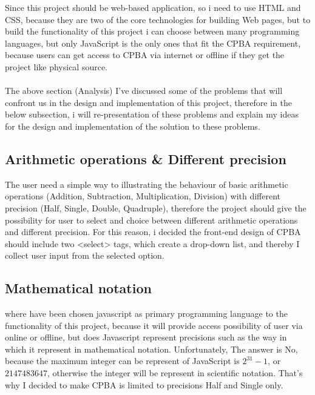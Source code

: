 \documentclass[11pt]{article}
\begin{document}
Since this project should be web-based application, so i need to use HTML and CSS, because they are two of the core technologies for building Web pages, but to build the functionality of this project i can choose between many programming languages, but only JavaScript is the only ones that fit the CPBA requirement, because users can get access to CPBA via internet or offline if they get the project like physical source.\\\\
The above section (Analysis) I’ve discussed some of the problems that will confront us in the design and implementation of this project, therefore in the below subsection, i will re-presentation of these problems and explain my ideas for the design and implementation of the solution to these problems.\\
\subsection{Arithmetic operations \& Different precision}
The user need a simple way to illustrating the behaviour of basic arithmetic operations (Addition, Subtraction, Multiplication, Division) with different precision (Half, Single, Double, Quadruple), therefore the project should give the possibility for user to select and choice between different arithmetic operations and different precision. For this reason, i decided the front-end design of CPBA should include  two  <select> tags, which create a drop-down list, and thereby I collect user input from the selected option.
\subsection{Mathematical notation}
where have been chosen javascript as primary programming language to the functionality of this project, because it will provide access possibility of user via online or offline, but does Javascript represent precisions such as the way in which it represent in mathematical notation. Unfortunately, The answer is No, because the maximum integer can be represent of JavaScript is $2^{31} -1$, or $2147483647$, otherwise the integer will be represent in scientific notation. That's why I decided to make CPBA is limited to precisions Half and Single only.
\end{document}
